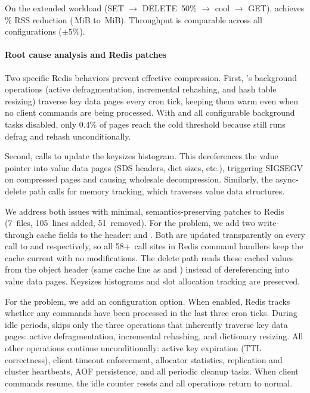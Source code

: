 On the extended workload (SET $\to$ DELETE~50\% $\to$ cool $\to$ GET),
\sys achieves \ablRedisExtDefaultRssRedInt\% RSS reduction
(\ablRedisExtBaselineServeRss\,MiB to \ablRedisExtDefaultServeRss\,MiB).
Throughput is comparable across all configurations ($\pm$5\%).

\paragraph{Root cause analysis and Redis patches}
Two specific Redis behaviors prevent effective compression.
First, 's background operations (active
defragmentation, incremental rehashing, and hash table resizing)
traverse key data pages every cron tick, keeping them warm even
when no client commands are being processed.  With
 and all configurable background tasks disabled,
only 0.4\% of pages reach the cold threshold because
 still runs defrag and rehash unconditionally.

Second,  calls  to
update the keysizes histogram.  This dereferences the value pointer
into value data pages (SDS headers, dict sizes, etc.),
triggering SIGSEGV on compressed pages and causing wholesale
decompression.  Similarly, the async-delete path calls
 for memory tracking, which traverses
value data structures.

We address both issues with minimal, semantics-preserving
patches to Redis (7~files, 105~lines added, 51~removed).
For the  problem, we add two write-through cache
fields to the  header:  and
.  Both are updated transparently
on every call to  and
 respectively, so all 58+~call sites
in Redis command handlers keep the cache current with no
modifications.  The delete path reads these cached values from
the object header (same cache line as  and
) instead of dereferencing into value data pages.
Keysizes histograms and slot allocation tracking are preserved.

For the  problem, we add an
 configuration option.  When enabled, Redis
tracks whether any commands have been processed in the last three
cron ticks.  During idle periods,  skips
only the three operations that inherently traverse key data
pages: active defragmentation, incremental rehashing, and
dictionary resizing.  All other operations
continue unconditionally: active key expiration (TTL correctness),
client timeout enforcement, allocator statistics, replication
and cluster heartbeats, AOF persistence, and all periodic cleanup
tasks.  When client commands resume, the idle counter resets and
all operations return to normal.

